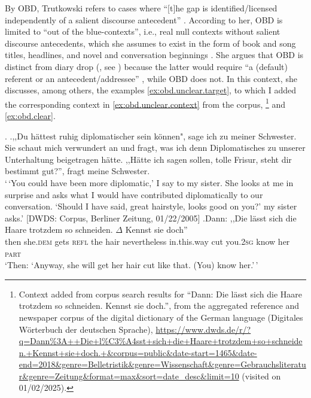 \largerpage
By OBD, Trutkowski refers to cases where ``[t]he gap is identified/licensed independently of a salient discourse antecedent''  \citep[187]{trutkowski2016}.
According to her, OBD is limited to ``out of the blue-contexts'', i.e., real null contexts without salient  discourse antecedents,  which she assumes to exist in the form of book and song titles, headlines, and novel and conversation beginnings \citep[188]{trutkowski2016}.
She argues that OBD is distinct from  diary drop (\cite{haegeman1990}, see ) because the latter would require ``a (default) referent or an antecedent/addressee''  \citep[192]{trutkowski2016}, while OBD does not.
In this context, she discusses, among others, the examples \ref{ex:obd.unclear.target}, to which I added the corresponding context in \ref{ex:obd.unclear.context} from the corpus,%
%
\footnote{Context added from corpus search results for ``Dann: Die lässt sich die Haare trotzdem so schneiden. Kennst sie doch.'', from the aggregated reference and newspaper corpus of the digital dictionary of the German language (Digitales Wörterbuch der deutschen Sprache),  \url{https://www.dwds.de/r/?q=Dann\%3A++Die+l\%C3\%A4sst+sich+die+Haare+trotzdem+so+schneiden.+Kennst+sie+doch.+&corpus=public&date-start=1465&date-end=2018&genre=Belletristik&genre=Wissenschaft&genre=Gebrauchsliteratur&genre=Zeitung&format=max&sort=date_desc&limit=10} (visited on 01/02/2025).}
%
 and \ref{ex:obd.clear}.

\ex.\label{ex:obd.unclear}
\a.\label{ex:obd.unclear.context},,Du hättest ruhig diplomatischer sein können", sage ich zu meiner Schwester.
Sie schaut mich verwundert an und fragt, was ich denn Diplomatisches zu unserer Unterhaltung beigetragen hätte.
,,Hätte ich sagen sollen, tolle Frisur, steht dir bestimmt gut?'', fragt meine Schwester.\\
`\,`You could have been more diplomatic,' I say to my sister.
She looks at me in surprise and asks what I would have contributed diplomatically to our conversation.
`Should I have said, great hairstyle, looks good on you?' my sister asks.' [DWDS: Corpus, Berliner Zeitung, 01/22/2005]
\bg.\label{ex:obd.unclear.target}Dann: ,,Die lässt sich die Haare trotzdem so schneiden. $\Delta$ Kennst sie doch''\\ 
then she.\textsc{dem} gets \textsc{refl} the hair nevertheless in.this.way cut you.\textsc{2sg} know her \textsc{part}\\
`Then: `Anyway, she will get her hair cut like that. (You) know her.'\,' \citep[190]{trutkowski2016}

